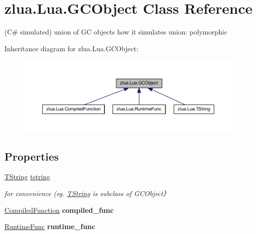 \hypertarget{classzlua_1_1_lua_1_1_g_c_object}{}\section{zlua.\+Lua.\+G\+C\+Object Class Reference}
\label{classzlua_1_1_lua_1_1_g_c_object}


(C\# simulated) union of GC objects how it simulates union\+: polymorphic  




Inheritance diagram for zlua.\+Lua.\+G\+C\+Object\+:
\nopagebreak
\begin{figure}[H]
\begin{center}
\leavevmode
\includegraphics[width=350pt]{classzlua_1_1_lua_1_1_g_c_object__inherit__graph}
\end{center}
\end{figure}
\subsection*{Properties}
\begin{DoxyCompactItemize}
\item 
\mbox{\hyperlink{classzlua_1_1_lua_1_1_t_string}{T\+String}} \mbox{\hyperlink{classzlua_1_1_lua_1_1_g_c_object_adb3aafad7ab9791defdd09ddb5f56d64}{tstring}}
\begin{DoxyCompactList}\small\item\em for convenience (eg. \mbox{\hyperlink{classzlua_1_1_lua_1_1_t_string}{T\+String}} is subclass of G\+C\+Object） \end{DoxyCompactList}\item 
\mbox{\label{classzlua_1_1_lua_1_1_g_c_object_af737475ae9f265e594bc78adef201ff8}} 
\mbox{\hyperlink{classzlua_1_1_lua_1_1_compiled_function}{Compiled\+Function}} {\bfseries compiled\+\_\+func}
\item 
\mbox{\label{classzlua_1_1_lua_1_1_g_c_object_a3e1ac4cb8e5ee80c17e680c7aa6e0cdb}} 
\mbox{\hyperlink{classzlua_1_1_lua_1_1_runtime_func}{Runtime\+Func}} {\bfseries runtime\+\_\+func}
\end{DoxyCompactItemize}


